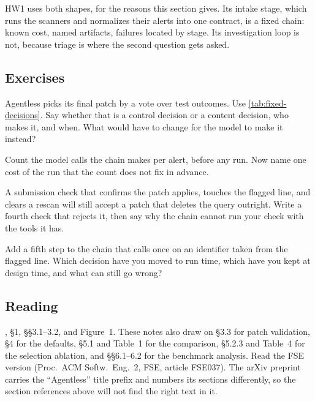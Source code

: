 HW1 uses both shapes, for the reasons this section gives. Its intake stage, which runs the scanners
and normalizes their alerts into one contract, is a fixed chain: known cost, named artifacts,
failures located by stage. Its investigation loop is not, because triage is where the second
question gets asked.

\subsection{Exercises}

\be

\item Agentless picks its final patch by a vote over test outcomes. Use
\cref{tab:fixed-decisions}. Say whether that is a control decision or a content decision, who
makes it, and when. What would have to change for the model to make it instead?

\item Count the model calls the chain makes per alert, before any run. Now name one cost of the
run that the count does not fix in advance.

\item A submission check that confirms the patch applies, touches the flagged line, and clears a
rescan will still accept a patch that deletes the query outright. Write a fourth check that rejects
it, then say why the chain cannot run your check with the tools it has.

\item Add a fifth step to the chain that calls  once on an identifier taken from
the flagged line. Which decision have you moved to run time, which have you kept at design time,
and what can still go wrong?

\ee

\subsection{Reading}

\citet{xia2025agentless}, \S1, \S\S3.1--3.2, and Figure~1. These notes also draw on
\S3.3 for patch validation, \S4 for the defaults, \S5.1 and Table~1 for the comparison, \S5.2.3
and Table~4 for the selection ablation, and \S\S6.1--6.2 for the benchmark analysis. Read the FSE
version (Proc.\ ACM Softw.\ Eng.\ 2, FSE, article FSE037). The arXiv preprint carries the
``Agentless'' title prefix and numbers its sections differently, so the section references above
will not find the right text in it.

